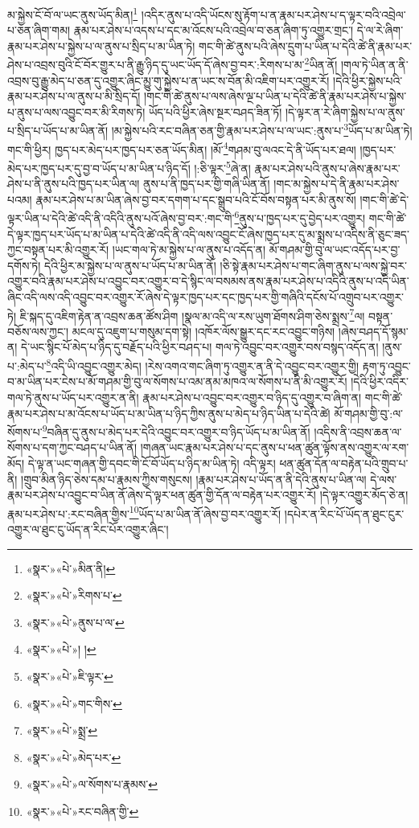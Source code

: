 མ་སྐྱེས་ངོ་བོ་ལ་ཡང་ནུས་ཡོད་མིན།\footnote{«སྣར་»«པེ་»མིན་ནི།} །འདིར་ནུས་པ་འདི་ཡོངས་སུ་རྟོག་པ་ན་རྣམ་པར་ཤེས་པ་ད་ལྟར་བའི་འབྲེལ་པ་ཅན་ཞིག་གམ། རྣམ་པར་ཤེས་པ་འདས་པ་དང་མ་འོངས་པའི་འབྲེལ་བ་ཅན་ཞིག་ཏུ་འགྱུར་གྲང་། དེ་ལ་རེ་ཞིག་རྣམ་པར་ཤེས་པ་སྐྱེས་པ་ལ་ནུས་པ་སྲིད་པ་མ་ཡིན་ཏེ། གང་གི་ཚེ་ནུས་པའི་ཞེས་དྲུག་པ་ཡིན་པ་དེའི་ཚེ་ནི་རྣམ་པར་ཤེས་པ་འབྲས་བུའི་ངོ་བོར་གྱུར་པ་ནི་རྒྱུ་ཉིད་དུ་ཡང་ཡོད་དོ་ཞེས་བྱ་བར་:རིགས་པ་མ་\footnote{«སྣར་»«པེ་»རིགས་པ་}ཡིན་ནོ། །གལ་ཏེ་ཡིན་ན་ནི་འབྲས་བུ་རྒྱུ་མེད་པ་ཅན་དུ་འགྱུར་ཞིང་མྱུ་གུ་སྐྱེས་པ་ན་ཡང་ས་བོན་མི་འཇིག་པར་འགྱུར་རོ། །དེའི་ཕྱིར་སྐྱེས་པའི་རྣམ་པར་ཤེས་པ་ལ་ནུས་པ་མི་སྲིད་དོ། །གང་གི་ཚེ་ནུས་པ་ལས་ཞེས་ལྔ་པ་ཡིན་པ་དེའི་ཚེ་ནི་རྣམ་པར་ཤེས་པ་སྐྱེས་པ་ནུས་པ་ལས་འབྱུང་བར་མི་རིགས་ཏེ། ཡོད་པའི་ཕྱིར་ཞེས་སྔར་བཤད་ཟིན་ཏོ། །དེ་ལྟར་ན་རེ་ཞིག་སྐྱེས་པ་ལ་ནུས་པ་སྲིད་པ་ཡོད་པ་མ་ཡིན་ནོ། །མ་སྐྱེས་པའི་རང་བཞིན་ཅན་གྱི་རྣམ་པར་ཤེས་པ་ལ་ཡང་:ནུས་པ་\footnote{«སྣར་»«པེ་»ནུས་པ་ལ་}ཡོད་པ་མ་ཡིན་ཏེ། གང་གི་ཕྱིར། ཁྱད་པར་མེད་པར་ཁྱད་པར་ཅན་ཡོད་མིན། །མོ་\footnote{«སྣར་»«པེ་»། །}གཤམ་བུ་ལའང་དེ་ནི་ཡོད་པར་ཐལ། །ཁྱད་པར་མེད་པར་ཁྱད་པར་དུ་བྱ་བ་ཡོད་པ་མ་ཡིན་པ་ཉིད་དོ། །:ཅི་ལྟར་\footnote{«སྣར་»«པེ་»ཇི་ལྟར་}ཞེ་ན། རྣམ་པར་ཤེས་པའི་ནུས་པ་ཞེས་རྣམ་པར་ཤེས་པ་ནི་ནུས་པའི་ཁྱད་པར་ཡིན་ལ། ནུས་པ་ནི་ཁྱད་པར་གྱི་གཞི་ཡིན་ནོ། །གང་མ་སྐྱེས་པ་དེ་ནི་རྣམ་པར་ཤེས་པའམ། རྣམ་པར་ཤེས་པ་མ་ཡིན་ཞེས་བྱ་བར་དགག་པ་དང་སྒྲུབ་པའི་ངོ་བོས་བསྟན་པར་མི་ནུས་སོ། །གང་གི་ཚེ་དེ་ལྟར་ཡིན་པ་དེའི་ཚེ་འདི་ནི་འདིའི་ནུས་པའོ་ཞེས་བྱ་བར་:གང་གི་\footnote{«སྣར་»«པེ་»གང་གིས་}ནུས་པ་ཁྱད་པར་དུ་བྱེད་པར་འགྱུར། གང་གི་ཚེ་དེ་ལྟར་ཁྱད་པར་ཡོད་པ་མ་ཡིན་པ་དེའི་ཚེ་འདི་ནི་འདི་ལས་འབྱུང་ངོ་ཞེས་ཁྱད་པར་དུ་མ་སྨྲས་པ་འདིས་ནི་ཅུང་ཟད་ཀྱང་བསྟན་པར་མི་འགྱུར་རོ། །ཡང་གལ་ཏེ་མ་སྐྱེས་པ་ལ་ནུས་པ་འདོད་ན། མོ་གཤམ་གྱི་བུ་ལ་ཡང་འདོད་པར་བྱ་དགོས་ཏེ། དེའི་ཕྱིར་མ་སྐྱེས་པ་ལ་ནུས་པ་ཡོད་པ་མ་ཡིན་ནོ། །ཅི་སྟེ་རྣམ་པར་ཤེས་པ་གང་ཞིག་ནུས་པ་ལས་སྐྱེ་བར་འགྱུར་བའི་རྣམ་པར་ཤེས་པ་འབྱུང་བར་འགྱུར་བ་དེ་སྙིང་ལ་བསམས་ནས་རྣམ་པར་ཤེས་པ་འདིའི་ནུས་པ་འདི་ཡིན་ཞིང་འདི་ལས་འདི་འབྱུང་བར་འགྱུར་རོ་ཞེས་དེ་ལྟར་ཁྱད་པར་དང་ཁྱད་པར་གྱི་གཞིའི་དངོས་པོ་འགྲུབ་པར་འགྱུར་ཏེ། ཇི་སྐད་དུ་འཇིག་རྟེན་ན་འབྲས་ཆན་ཚོས་ཤིག །སྣལ་མ་འདི་ལ་རས་ཡུག་ཐོགས་ཤིག་ཅེས་སྨྲས་\footnote{«སྣར་»«པེ་»སྨྲ་}ལ། བསྟན་བཅོས་ལས་ཀྱང་། མངལ་དུ་འཇུག་པ་གསུམ་དག་སྟེ། །འཁོར་ལོས་སྒྱུར་དང་རང་འབྱུང་གཉིས། །ཞེས་བཤད་དོ་སྙམ་ན། དེ་ཡང་སྙིང་པོ་མེད་པ་ཉིད་དུ་བརྗོད་པའི་ཕྱིར་བཤད་པ། གལ་ཏེ་འབྱུང་བར་འགྱུར་བས་བསྙད་འདོད་ན། །ནུས་པ་:མེད་པ་\footnote{«སྣར་»«པེ་»མེད་པར་}འདི་ཡི་འབྱུང་འགྱུར་མེད། །རེས་འགའ་གང་ཞིག་ཏུ་འགྱུར་ན་ནི་དེ་འབྱུང་བར་འགྱུར་གྱི། རྟག་ཏུ་འབྱུང་བ་མ་ཡིན་པར་ངེས་པ་མོ་གཤམ་གྱི་བུ་ལ་སོགས་པ་འམ་ནམ་མཁའ་ལ་སོགས་པ་ནི་མི་འགྱུར་རོ། །དེའི་ཕྱིར་འདིར་གལ་ཏེ་ནུས་པ་ཡོད་པར་འགྱུར་ན་ནི། རྣམ་པར་ཤེས་པ་འབྱུང་བར་འགྱུར་བ་ཉིད་དུ་འགྱུར་བ་ཞིག་ན། གང་གི་ཚེ་རྣམ་པར་ཤེས་པ་མ་འོངས་པ་ཡོད་པ་མ་ཡིན་པ་ཉིད་ཀྱིས་ནུས་པ་མེད་པ་ཉིད་ཡིན་པ་དེའི་ཚེ། མོ་གཤམ་གྱི་བུ་:ལ་སོགས་པ་\footnote{«སྣར་»«པེ་»ལ་སོགས་པ་རྣམས་}བཞིན་དུ་ནུས་པ་མེད་པར་དེའི་འབྱུང་བར་འགྱུར་བ་ཉིད་ཡོད་པ་མ་ཡིན་ནོ། །འདིས་ནི་འབྲས་ཆན་ལ་སོགས་པ་དག་ཀྱང་བཤད་པ་ཡིན་ནོ། །གཞན་ཡང་རྣམ་པར་ཤེས་པ་དང་ནུས་པ་ཕན་ཚུན་ལྟོས་ནས་འགྱུར་ལ་རག་མོད། དེ་ལྟ་ན་ཡང་གཞན་གྱི་དབང་གི་ངོ་བོ་ཡོད་པ་ཉིད་མ་ཡིན་ཏེ། འདི་ལྟར། ཕན་ཚུན་དོན་ལ་བརྟེན་པའི་གྲུབ་པ་ནི། །གྲུབ་མིན་ཉིད་ཅེས་དམ་པ་རྣམས་ཀྱིས་གསུངས། །རྣམ་པར་ཤེས་པ་ཡོད་ན་ནི་དེའི་ནུས་པ་ཡིན་ལ། དེ་ལས་རྣམ་པར་ཤེས་པ་འབྱུང་བ་ཡིན་ནོ་ཞེས་དེ་ལྟར་ཕན་ཚུན་གྱི་དོན་ལ་བརྟེན་པར་འགྱུར་རོ། །དེ་ལྟར་འགྱུར་མོད་ཅེ་ན། རྣམ་པར་ཤེས་པ་:རང་བཞིན་གྱིས་\footnote{«སྣར་»«པེ་»རང་བཞིན་གྱི་}ཡོད་པ་མ་ཡིན་ནོ་ཞེས་བྱ་བར་འགྱུར་རོ། །དཔེར་ན་རིང་པོ་ཡོད་ན་ཐུང་ངུར་འགྱུར་ལ་ཐུང་ངུ་ཡོད་ན་རིང་པོར་འགྱུར་ཞིང་། 